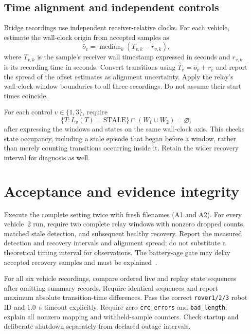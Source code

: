 \documentclass[10pt,a4paper]{article}
\begin{document}
\subsection{Time alignment and independent controls}
Bridge recordings use independent receiver-relative clocks. For each
vehicle, estimate the wall-clock origin from accepted samples as
\begin{equation}
\widehat{o}_v=\operatorname{median}_k(T_{v,k}-r_{v,k}),
\end{equation}
where $T_{v,k}$ is the sample's receiver wall timestamp expressed in seconds
and $r_{v,k}$ is its recording time in seconds. Convert transitions using
$\widehat{T}_v=\widehat{o}_v+r_v$ and report the spread of the offset
estimates as alignment uncertainty. Apply the relay's wall-clock window
boundaries to all three recordings. Do not assume their start times coincide.

For each control $v\in\{1,3\}$, require
\begin{equation}
\{T:L_v(T)=\mathrm{STALE}\}\cap(W_1\cup W_2)=\varnothing,
\end{equation}
after expressing the windows and states on the same wall-clock axis.
This checks state occupancy, including a stale episode that began before
a window, rather than merely counting transitions occurring inside it.
Retain the wider recovery interval for diagnosis as well.

\section{Acceptance and evidence integrity}
Execute the complete setting twice with fresh filenames (A1 and A2).
For every vehicle~2 run, require two complete relay windows with nonzero
dropped counts, matched stale detection, and subsequent healthy recovery.
Report the measured detection and recovery intervals and alignment spread;
do not substitute a theoretical timing interval for observations.
The battery-age gate may delay accepted recovery samples and must be
explained~\cite{mavlink}.

For all six vehicle recordings, compare ordered live and replay state
sequences after omitting summary records. Require identical sequences and
report maximum absolute transition-time differences. Pass the correct
\texttt{rover1/2/3} robot ID and 1.0~s timeout explicitly. Require zero
\texttt{crc\_errors} and \texttt{bad\_length}; explain all nonzero mapping
and withheld-sample counters. Check startup and deliberate shutdown
separately from declared outage intervals.
\end{document}
